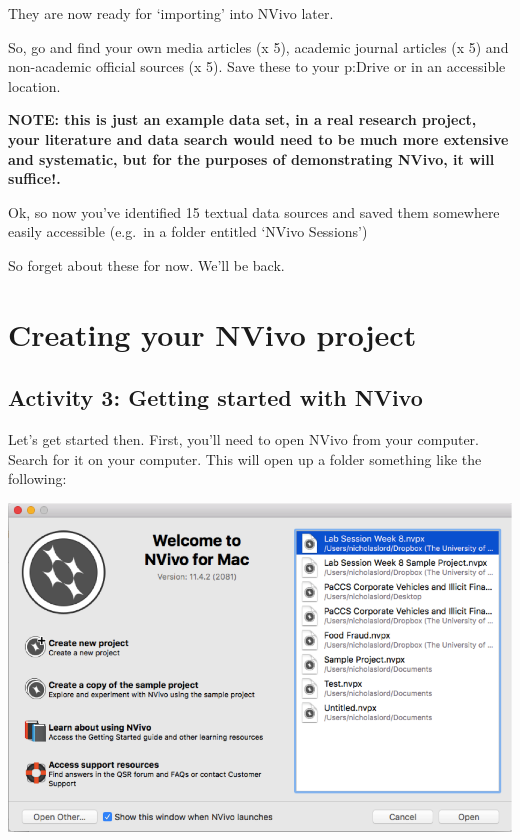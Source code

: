 \documentclass[]{book}
\theoremstyle{definition}
\theoremstyle{definition}
\theoremstyle{definition}
\theoremstyle{remark}
\begin{document}
They are now ready for `importing' into NVivo later.

So, go and find your own media articles (x 5), academic journal articles
(x 5) and non-academic official sources (x 5). Save these to your
p:Drive or in an accessible location.

\textbf{NOTE: this is just an example data set, in a real research
project, your literature and data search would need to be much more
extensive and systematic, but for the purposes of demonstrating NVivo,
it will suffice!.}

Ok, so now you've identified 15 textual data sources and saved them
somewhere easily accessible (e.g.~in a folder entitled `NVivo Sessions')

So forget about these for now. We'll be back.

\hypertarget{creating-your-nvivo-project}{%
\section{Creating your NVivo
project}\label{creating-your-nvivo-project}}

\hypertarget{activity-3-getting-started-with-nvivo}{%
\subsection{Activity 3: Getting started with
NVivo}\label{activity-3-getting-started-with-nvivo}}

Let's get started then. First, you'll need to open NVivo from your
computer. Search for it on your computer. This will open up a folder
something like the following:

\includegraphics{imgs/qual_05.png}
\end{document}
